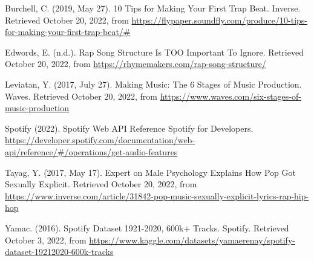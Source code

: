 \documentclass[
]{article}
\begin{document}
Burchell, C. (2019, May 27). 10 Tips for Making Your First Trap Beat.
Inverse. Retrieved October 20, 2022, from
\url{https://flypaper.soundfly.com/produce/10-tips-for-making-your-first-trap-beat/\#}

Edwords, E. (n.d.). Rap Song Structure Is TOO Important To Ignore.
Retrieved October 20, 2022, from
\url{https://rhymemakers.com/rap-song-structure/}

Leviatan, Y. (2017, July 27). Making Music: The 6 Stages of Music
Production. Waves. Retrieved October 20, 2022, from
\url{https://www.waves.com/six-stages-of-music-production}

Spotify (2022). Spotify Web API Reference \textbar{} Spotify for
Developers.
\url{https://developer.spotify.com/documentation/web-api/reference/\#/operations/get-audio-features}

Tayag, Y. (2017, May 17). Expert on Male Psychology Explains How Pop Got
Sexually Explicit. Retrieved October 20, 2022, from
\url{https://www.inverse.com/article/31842-pop-music-sexually-explicit-lyrics-rap-hip-hop}

Yamac. (2016). Spotify Dataset 1921-2020, 600k+ Tracks. Spotify.
Retrieved October 3, 2022, from
\url{https://www.kaggle.com/datasets/yamaerenay/spotify-dataset-19212020-600k-tracks}
\end{document}
